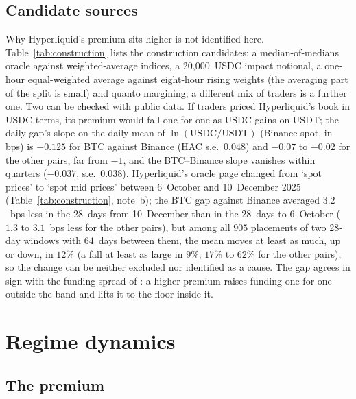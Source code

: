 \documentclass[10pt,a4paper]{article}
\newcommand{\MSAR}{\textsc{ms-ar}}
\begin{document}
\subsection{Candidate sources}

Why Hyperliquid's premium sits higher is not identified here. Table~\ref{tab:construction} lists the construction candidates: a median-of-medians oracle against weighted-average indices, a 20{,}000~USDC impact notional, a one-hour equal-weighted average against eight-hour rising weights (the averaging part of the split is small) and quanto margining; a different mix of traders is a further one. Two can be checked with public data. If traders priced Hyperliquid's book in USDC terms, its premium would fall one for one as USDC gains on USDT; the daily gap's slope on the daily mean of $\ln(\text{USDC}/\text{USDT})$ (Binance spot, in bps) is $-0.125$ for BTC against Binance (HAC s.e.\ $0.048$) and $-0.07$ to $-0.02$ for the other pairs, far from $-1$, and the BTC--Binance slope vanishes within quarters ($-0.037$, s.e.\ $0.038$). Hyperliquid's oracle page changed from `spot prices' to `spot mid prices' between 6~October and 10~December 2025 (Table~\ref{tab:construction}, note~b); the BTC gap against Binance averaged $3.2$~bps less in the 28~days from 10~December than in the 28~days to 6~October ($1.3$ to $3.1$~bps less for the other pairs), but among all $905$ placements of two 28-day windows with $64$~days between them, the mean moves at least as much, up or down, in $12\%$ (a fall at least as large in $9\%$; $17\%$ to $62\%$ for the other pairs), so the change can be neither excluded nor identified as a cause. The gap agrees in sign with the funding spread of \citet{lau2026carry}: a higher premium raises funding one for one outside the band and lifts it to the floor inside it.

\section{Regime dynamics}\label{sec:regimes}

\subsection{The premium}\label{ssec:msar}

\begin{table}[tbp]
  \centering
  \caption{The two-state \MSAR(1) of equation~\eqref{eq:msar} on the premium, estimation window, with the fitted chain and robust inference. $\hat\mu_k$ is the regime level, not an intercept. Half-life intervals transform $\hat\phi_k$'s Wald interval; an end at $\infty$ means that interval reaches a unit root. $\hat\tau^{\text{sw}}_k$ is the first hour at which the expected deviation from regime~$k$ falls to one half under the fitted chain. Side of unity: the Wald test of $\phi_{\text{calm}} = \phi_{\text{stressed}}$ at $5\%$ (n.s.: not significant); the $95\%$ sets are descriptive.}
  \label{tab:msar}
  \footnotesize
  
\end{table}
\end{document}
